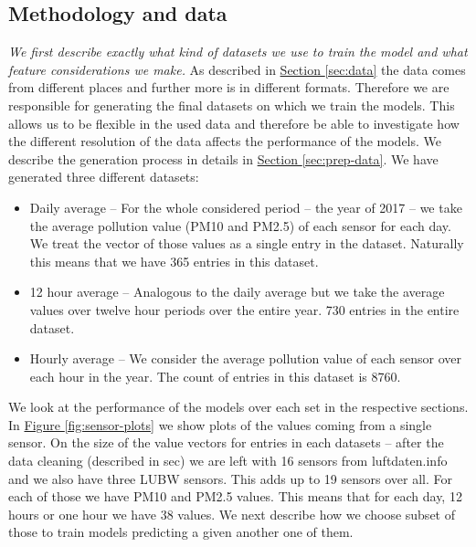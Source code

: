 \documentclass[12pt,a4paper,twoside]{scrartcl}
\numberwithin{equation}{section}
\newcommand{\reffig}[1]{\hyperref[#1]{Figure \ref*{#1}}}
\newcommand{\refsec}[1]{\hyperref[#1]{Section \ref*{#1}}}
\begin{document}
\subsection{Methodology and data}\label{sec:preprop-meth}
\noindent
\emph{We first describe exactly what kind of datasets we use to train the model and what feature considerations we make.}
As described in \refsec{sec:data} the data comes from different places and further more is in different formats. Therefore we are responsible for generating the final datasets on which we train the models. This allows us to be flexible in the used data and therefore be able to investigate how the different resolution of the data affects the performance of the models. We describe the generation process in details in \refsec{sec:prep-data}. We have generated three different datasets:
\begin{itemize}
\item Daily average -- For the whole considered period -- the year of 2017 -- we take the average pollution value (PM10 and PM2.5) of each sensor for each day. We treat the vector of those values as a single entry in the dataset. Naturally this means that we have 365 entries in this dataset.
\item 12 hour average -- Analogous to the daily average but we take the average values over twelve hour periods over the entire year. 730 entries in the entire dataset.
\item Hourly average -- We consider the average pollution value of each sensor over each hour in the year. The count of entries in this dataset is 8760.
\end{itemize}
We look at the performance of the models over each set in the respective sections. In \reffig{fig:sensor-plots} we show plots of the values coming from a single sensor. On the size of the value vectors for entries in each datasets -- after the data cleaning (described in sec) we are left with 16 sensors from luftdaten.info and we also have three LUBW sensors. This adds up to 19 sensors over all. For each of those we have PM10 and PM2.5 values. This means that for each day, 12 hours or one hour we have 38 values. We next describe how we choose subset of those to train models predicting a given another one of them.
\end{document}
